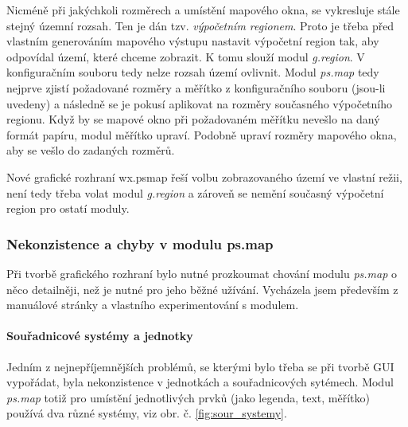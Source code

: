 \documentclass[a4paper,12pt,draft]{article}
\newcommand{\modul}[1]{\emph{#1}}
\begin{document}
Nicméně při jakýchkoli rozměrech a umístění mapového okna, se vykresluje stále stejný územní rozsah. Ten je dán tzv. \emph{výpočetním regionem}. Proto je třeba před vlastním generováním mapového výstupu nastavit výpočetní region tak, aby odpovídal území, které chceme zobrazit. K tomu slouží modul \modul{g.region}. V konfiguračním souboru tedy nelze rozsah území ovlivnit.
Modul \modul{ps.map} tedy nejprve zjistí požadované rozměry a měřítko z konfiguračního souboru (jsou-li uvedeny) a následně se je pokusí aplikovat na rozměry současného výpočetního regionu. Když by se mapové okno při požadovaném měřítku nevešlo na daný formát papíru, modul měřítko upraví. Podobně upraví rozměry mapového okna, aby se vešlo do zadaných rozměrů.

Nové grafické rozhraní wx.psmap řeší volbu zobrazovaného území ve vlastní režii, není tedy třeba volat modul \modul{g.region} a zároveň se nemění současný výpočetní region pro ostatí moduly. %

\subsubsection{Nekonzistence a chyby v modulu ps.map}
\label{sec:psmap:chyby}
Při tvorbě grafického rozhraní bylo nutné prozkoumat chování modulu \modul{ps.map} o něco detailněji, než je nutné pro jeho běžné užívání. Vycházela jsem především z manuálové stránky \cite{manual} a vlastního experimentování s modulem. 

\paragraph*{Souřadnicové systémy a jednotky}
\label{sec:psmap:sour_systemy}
Jedním z nejnepříjemnějších problémů, se kterými bylo třeba se při tvorbě GUI vypořádat, byla nekonzistence v jednotkách a souřadnicových sytémech. Modul \modul{ps.map} totiž pro umístění jednotlivých prvků (jako legenda, text, měřítko) používá dva různé systémy, viz obr. č. \ref{fig:sour_systemy}.
\end{document}
